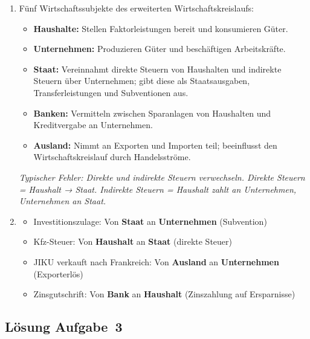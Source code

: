 \documentclass[11pt, a4paper]{article}
\begin{document}
\begin{enumerate}[label=(\alph*)]
  \item Fünf Wirtschaftssubjekte des erweiterten Wirtschaftskreislaufs:
  \begin{itemize}
    \item \textbf{Haushalte:} Stellen Faktorleistungen bereit und konsumieren Güter.
    \item \textbf{Unternehmen:} Produzieren Güter und beschäftigen Arbeitskräfte.
    \item \textbf{Staat:} Vereinnahmt direkte Steuern von Haushalten und indirekte Steuern über Unternehmen; gibt diese als Staatsausgaben, Transferleistungen und Subventionen aus.
    \item \textbf{Banken:} Vermitteln zwischen Sparanlagen von Haushalten und Kreditvergabe an Unternehmen.
    \item \textbf{Ausland:} Nimmt an Exporten und Importen teil; beeinflusst den Wirtschaftskreislauf durch Handelsströme.
  \end{itemize}

  \textit{Typischer Fehler: Direkte und indirekte Steuern verwechseln. Direkte Steuern = Haushalt
  → Staat. Indirekte Steuern = Haushalt zahlt an Unternehmen, Unternehmen an Staat.}

  \item
  \begin{itemize}
    \item Investitionszulage: Von \textbf{Staat} an \textbf{Unternehmen} (Subvention)
    \item Kfz-Steuer: Von \textbf{Haushalt} an \textbf{Staat} (direkte Steuer)
    \item JIKU verkauft nach Frankreich: Von \textbf{Ausland} an \textbf{Unternehmen} (Exporterlös)
    \item Zinsgutschrift: Von \textbf{Bank} an \textbf{Haushalt} (Zinszahlung auf Ersparnisse)
  \end{itemize}
\end{enumerate}

\subsection*{Lösung Aufgabe~3}
\end{document}

